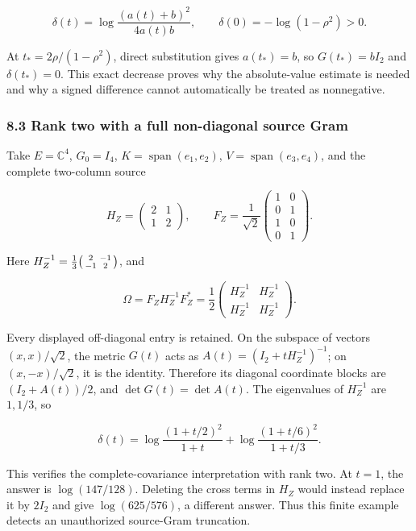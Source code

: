 \documentclass[11pt]{article}
\begin{document}
\[
\delta(t)=\log\frac{(a(t)+b)^2}{4a(t)b},
\qquad \delta(0)=-\log(1-\rho^2)>0.
\tag{CA40}
\]

At \(t_*=2\rho/(1-\rho^2)\), direct substitution gives \(a(t_*)=b\), so \(G(t_*)=bI_2\) and \(\delta(t_*)=0\). This exact decrease proves why the absolute-value estimate is needed and why a signed difference cannot automatically be treated as nonnegative.

\subsubsection{8.3 Rank two with a full non-diagonal source Gram}\label{rank-two-with-a-full-non-diagonal-source-gram}

Take \(E=\mathbb C^4\), \(G_0=I_4\), \(K=\operatorname{span}(e_1,e_2)\), \(V=\operatorname{span}(e_3,e_4)\), and the complete two-column source

\[
H_Z=\begin{pmatrix}2&1\\1&2\end{pmatrix},\qquad
F_Z=\frac1{\sqrt2}\begin{pmatrix}1&0\\0&1\\1&0\\0&1\end{pmatrix}.
\]

Here \(H_Z^{-1}=\frac13\begin{psmallmatrix}2&-1\\-1&2\end{psmallmatrix}\), and

\[
\Omega=F_ZH_Z^{-1}F_Z^*
=\frac12\begin{pmatrix}H_Z^{-1}&H_Z^{-1}\\
H_Z^{-1}&H_Z^{-1}\end{pmatrix}.
\tag{CA41}
\]

Every displayed off-diagonal entry is retained. On the subspace of vectors \((x,x)/\sqrt2\), the metric \(G(t)\) acts as \(A(t)=(I_2+tH_Z^{-1})^{-1}\); on \((x,-x)/\sqrt2\), it is the identity. Therefore its diagonal coordinate blocks are \((I_2+A(t))/2\), and \(\det G(t)=\det A(t)\). The eigenvalues of \(H_Z^{-1}\) are \(1,1/3\), so

\[
\delta(t)=
\log\frac{(1+t/2)^2}{1+t}
+\log\frac{(1+t/6)^2}{1+t/3}.
\tag{CA42}
\]

This verifies the complete-covariance interpretation with rank two. At \(t=1\), the answer is \(\log(147/128)\). Deleting the cross terms in \(H_Z\) would instead replace it by \(2I_2\) and give \(\log(625/576)\), a different answer. Thus this finite example detects an unauthorized source-Gram truncation.
\end{document}
